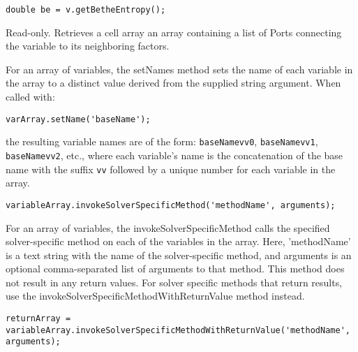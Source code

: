 \ifjava
\begin{lstlisting}
double be = v.getBetheEntropy();
\end{lstlisting}
\fi



Read-only.  Retrieves \ifmatlab a cell array \fi \ifjava an array \fi containing a list of Ports connecting the variable to its neighboring factors.

\ifmatlab
{}
\fi

\ifmatlab
{}
\label{sec:Variable.setNames}

For an array of variables, the setNames method sets the name of each variable in the array to a distinct value derived from the supplied string argument.  When called with:

\begin{lstlisting}
varArray.setName('baseName');
\end{lstlisting}

the resulting variable names are of the form: \texttt{baseName\textunderscore vv0}, \texttt{baseName\textunderscore vv1}, \texttt{baseName\textunderscore vv2}, etc., where each variable's name is the concatenation of the base name with the suffix \texttt{\textunderscore vv} followed by a unique number for each variable in the array.
\fi

\ifmatlab
{}

\begin{lstlisting}
variableArray.invokeSolverSpecificMethod('methodName', arguments);
\end{lstlisting}

For an array of variables, the invokeSolverSpecificMethod calls the specified solver-specific method on each of the variables in the array.  Here, 'methodName' is a text string with the name of the solver-specific method, and arguments is an optional comma-separated list of arguments to that method.  This method does not result in any return values.  For solver specific methods that return results, use the invokeSolverSpecificMethodWithReturnValue method instead.

\fi

\ifmatlab
{}

\begin{lstlisting}
returnArray = variableArray.invokeSolverSpecificMethodWithReturnValue('methodName', arguments);
\end{lstlisting}

